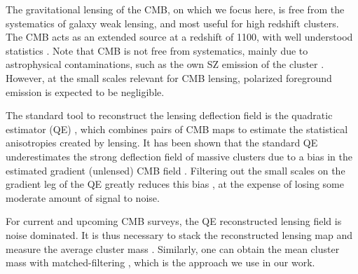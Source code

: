\documentclass[prd, superscriptaddress, tightenlines, longbibliography, nofootinbib, eqsecnum, amsfonts, amsmath, floatfix, twocolumn, notitlepage]{revtex4-2}
\newcommand{\LL}[1]{{\color{orange}{LL: #1}}}
\begin{document}

The gravitational lensing of the CMB, on which we focus here, is free from the systematics of galaxy weak lensing, and most useful for high redshift clusters. 
The CMB acts as an extended source at a redshift of 1100, with well understood statistics \cite{Lewis:2006fu}.
Note that CMB is not free from systematics, mainly due to astrophysical contaminations, such as the own SZ emission of the cluster \cite{Madhavacheril:2018bxi, DES:2018myw, Patil_2020}.
However, at the small scales relevant for CMB lensing, polarized foreground emission is expected to be negligible.

The standard tool to reconstruct the lensing deflection field is the quadratic estimator (QE) \cite{Hu:2001tn, Hu:2001kj, Okamoto:2003zw, Planck:2018lbu}, which combines pairs of CMB maps to estimate the statistical anisotropies created by lensing.
It has been shown that the standard QE underestimates the strong deflection field of massive clusters due to a bias in the estimated gradient (unlensed) CMB field \cite{Maturi:2004zj}. Filtering out the small scales on the gradient leg of the QE greatly reduces this bias \cite{Hu:2007bt}, at the expense of losing some moderate amount of signal to noise.

For current and upcoming CMB surveys, the QE reconstructed lensing field is noise dominated. It is thus necessary to stack the reconstructed lensing map and measure the average cluster mass \cite{DES:2017fyz, Geach:2017crt, DES:2018myw, ACT:2020izl}. Similarly, one can obtain the mean cluster mass with matched-filtering \cite{Melin:2014uaa, Louis:2016gvv, Zubeldia:2019brr, Zubeldia:2020knz}, which is the approach we use in our work. \LL{Maybe this paragraph should be moved later (even maybe on the section II B ?)}
\end{document}
